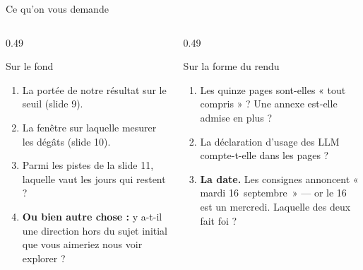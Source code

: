 \documentclass[aspectratio=169,11pt]{beamer}
\begin{document}
\begin{frame}{Ce qu'on vous demande}
  \begin{columns}[t]
    \begin{column}{0.49\textwidth}
      \begin{block}{\small Sur le fond}
        \small
        \begin{enumerate}
          \item La portée de notre résultat sur le seuil (slide 9).
          \item La fenêtre sur laquelle mesurer les dégâts (slide 10).
          \item Parmi les pistes de la slide 11, laquelle vaut les jours qui
            restent ?
          \item \textbf{Ou bien autre chose :} y a-t-il une direction hors du
            sujet initial que vous aimeriez nous voir explorer ?
        \end{enumerate}
      \end{block}
    \end{column}
    \begin{column}{0.49\textwidth}
      \begin{block}{\small Sur la forme du rendu}
        \small
        \begin{enumerate}
          \item Les quinze pages sont-elles « tout compris » ? Une annexe
            est-elle admise en plus ?
          \item La déclaration d'usage des LLM compte-t-elle dans les pages ?
          \item \textbf{La date.} Les consignes annoncent « mardi
            16~septembre~» --- or le 16 est un mercredi. Laquelle des deux
            fait foi ?
        \end{enumerate}
      \end{block}
    \end{column}
  \end{columns}
\end{frame}
\end{document}
